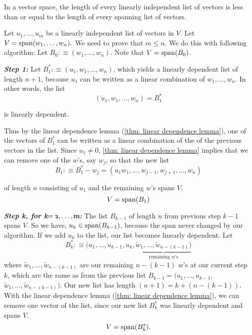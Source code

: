 \begin{thm}  
  \label{thm: length of linearly dependent list less or equal to length of spanning list}
  In a \fd vector space, the length of every linearly independent list of vectors is less than or equal to the length of every spanning list of vectors.
\end{thm}
\begin{prf}
  Let $u_1, \ldots, u_m$ be a linearly independent list of vectors in $V$. Let $V=\operatorname{span} (w_1, \ldots, w_n).$ We need to prove that $m \leq n$. We do this with following algorithm: Let $B_0 :\equiv  (w_1, \ldots, w_n)$. Note that $V=\operatorname{span} (B_0)$.
  
  \emph{\bfseries Step 1:} Let $B_1^* :\equiv (u_1, w_1, \ldots, w_n)$, which yields a linearly dependent list of length $n+1$, because $u_1$ can be written as a linear combination of $w_1, \ldots, w_n$. In other words, the list 
  \begin{equation}
    (u_1, w_1, \ldots, w_n) = B_1^*
  \end{equation}
  
  is linearly dependent.
  
  Thus by the linear dependence lemma (\ref{thm: linear dependence lemma}), one of the vectors of $B_1^*$ can be written as a linear combination of the of the previous vectors in the list. Since $u_1 \neq 0$, \ref{thm: linear dependence lemma} implies that we can remove one of the $w$'s, say $w_j$, so that the new list 
  \begin{equation}
    B_1 :\equiv B_1^* - {w_j} = (u_1 w_1, \ldots, w_{j-1}, w_{j+1}, \ldots, w_n)
  \end{equation}
  
  of length $n$ consisting of $u_1$ and the remaining $w$'s spans $V$. \begin{equation}
    V=\operatorname{span} (B_1)
  \end{equation}
  
  \emph{\bfseries Step k, for k$=\mathbf{\mathsmaller{2}, \ldots,}$m:} The list $B_{k-1}$ of length $n$ from previous step $k-1$ spans $V$. So we have, $u_k \in \operatorname{span} (B_{k-1})$, because the span never changed by our algorithm. If we add $u_k$ to the list, our list becomes linearly dependent. Let
  \begin{equation}
    B_k^* :\equiv (u_1, \ldots, u_{k-1}, u_k, \underbrace{\tilde w_{1}, \ldots, \tilde w_{n-(k-1)})}_{\text{remaining $w$'s}} 
  \end{equation}
  where $\tilde w_{1}, \ldots, \tilde w_{n-(k-1)}$ are our remaining $n-(k-1)$ $w$'s at our current step $k$, which are the same as from the previous list $B_{k-1}$$=$$(u_1, \ldots,u_{k-1},$$ \tilde w_{1}, \ldots, \tilde w_{n-(k-1)})$. Our new list has length $(n+1) = k + (n-(k-1))$. With the linear dependence lemma (\ref{thm: linear dependence lemma}), we can remove one vector of the list, since our new list $B_{k}^*$ was linearly dependent and spans $V$. 
  \begin{equation}
    V=\operatorname{span} (B_{k}^*). 
  \end{equation}
  

\end{prf}
